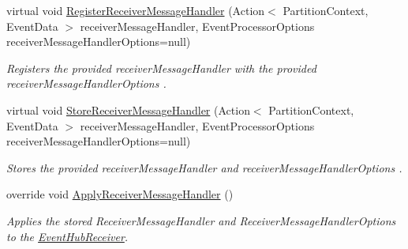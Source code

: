 \begin{DoxyCompactItemize}
virtual void \hyperlink{classCqrs_1_1Azure_1_1ServiceBus_1_1AzureEventHub_afbea0e107f3d4e8f8d4f2215ff2f7787_afbea0e107f3d4e8f8d4f2215ff2f7787}{Register\+Receiver\+Message\+Handler} (Action$<$ Partition\+Context, Event\+Data $>$ receiver\+Message\+Handler, Event\+Processor\+Options receiver\+Message\+Handler\+Options=null)
\begin{DoxyCompactList}\small\item\em Registers the provided {\itshape receiver\+Message\+Handler}  with the provided {\itshape receiver\+Message\+Handler\+Options} . \end{DoxyCompactList}\item 
virtual void \hyperlink{classCqrs_1_1Azure_1_1ServiceBus_1_1AzureEventHub_a5924517b1e88c09e3c0c1aec9c737a8d_a5924517b1e88c09e3c0c1aec9c737a8d}{Store\+Receiver\+Message\+Handler} (Action$<$ Partition\+Context, Event\+Data $>$ receiver\+Message\+Handler, Event\+Processor\+Options receiver\+Message\+Handler\+Options=null)
\begin{DoxyCompactList}\small\item\em Stores the provided {\itshape receiver\+Message\+Handler}  and {\itshape receiver\+Message\+Handler\+Options} . \end{DoxyCompactList}\item 
override void \hyperlink{classCqrs_1_1Azure_1_1ServiceBus_1_1AzureEventHub_af2efc497815828b6fe0b4d6621bc8b41_af2efc497815828b6fe0b4d6621bc8b41}{Apply\+Receiver\+Message\+Handler} ()
\begin{DoxyCompactList}\small\item\em Applies the stored Receiver\+Message\+Handler and Receiver\+Message\+Handler\+Options to the \hyperlink{classCqrs_1_1Azure_1_1ServiceBus_1_1AzureEventHub_a1b12b47dbb9b9afe2014477a2e457c35_a1b12b47dbb9b9afe2014477a2e457c35}{Event\+Hub\+Receiver}. \end{DoxyCompactList}\end{DoxyCompactItemize}
